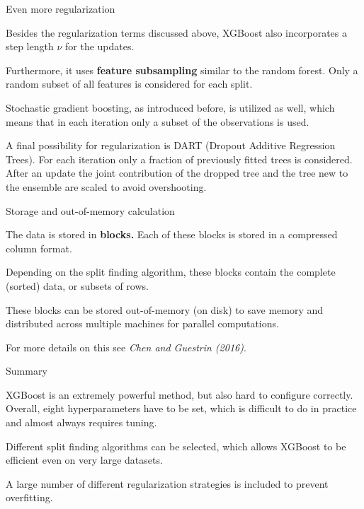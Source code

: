 \begin{vbframe}{Even more regularization}

Besides the regularization terms discussed above, XGBoost also incorporates a step length $\nu$ for the updates.

\lz

Furthermore, it uses \textbf{feature subsampling} similar to the random forest. Only a random subset of all features is considered for each split.

\lz

Stochastic gradient boosting, as introduced before, is utilized as well,
which means that in each iteration only a subset of the observations is used.

\lz

A final possibility for regularization is DART (Dropout Additive Regression Trees).
For each iteration only a fraction of previously fitted trees is considered.
After an update the joint contribution of the dropped tree and the tree new to the ensemble are scaled to avoid overshooting.

\end{vbframe}

\begin{vbframe}{Storage and out-of-memory calculation}

The data is stored in \textbf{blocks.}
Each of these blocks is stored in a compressed column format.

\lz

Depending on the split finding algorithm, these blocks contain the complete (sorted) data, or subsets of rows.

\lz

These blocks can be stored out-of-memory (on disk) to save memory and distributed across multiple machines for parallel computations.

\lz

For more details on this see \emph{Chen and Guestrin (2016)}.

\end{vbframe}

\begin{vbframe}{Summary}

XGBoost is an extremely powerful method, but also hard to configure correctly.
Overall, eight hyperparameters have to be set, which is difficult to do in practice and almost always requires tuning.

\lz

Different split finding algorithms can be selected, which allows XGBoost to be efficient even on very large datasets.

\lz

A large number of different regularization strategies is included to prevent overfitting.


\end{vbframe}

